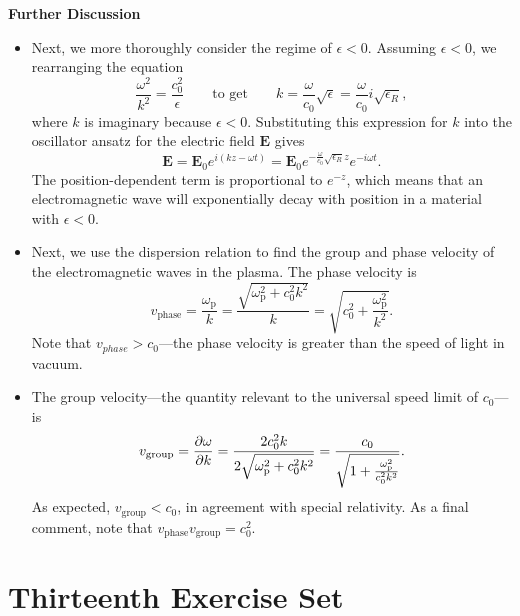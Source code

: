 \documentclass[11pt, a4paper]{article}
\newcommand{\eqtext}[1]{\qquad \text{#1} \qquad}
\renewcommand{\vec}[1]{\bm{#1}} %
\newcommand{\E}{\vec{E}}  %
\newcommand{\e}{\epsilon}
\begin{document}
\textbf{Further Discussion}	
\begin{itemize}
	
	\item Next, we more thoroughly consider the regime of $ \e < 0 $. Assuming $ \e < 0 $, we rearranging the equation 
	\begin{equation*}
		\frac{\omega^{2}}{k^{2}} = \frac{c_{0}^{2}}{\e} \eqtext{to get} k = \frac{\omega}{c_{0}}\sqrt{\e}  = \frac{\omega}{c_{0}}i \sqrt{\e_{R}},
	\end{equation*}
	where $ k $ is imaginary because $ \e < 0 $. Substituting this expression for $ k $ into the oscillator ansatz for the electric field $ \E $ gives
	\begin{equation*}
		\E = \E_{0} e^{i(kz - \omega t)} = \E_{0}e^{-\frac{\omega}{c_{0}}\sqrt{\e_{R}}z}e^{-i\omega t}.
	\end{equation*}
	The position-dependent term is proportional to $ e^{-z} $, which means that an electromagnetic wave will exponentially decay with position in a material with $ \e < 0 $. 
	
	\item Next, we use the dispersion relation to find the group and phase velocity of the electromagnetic waves in the plasma. The phase velocity is 
	\begin{equation*}
		v_{\text{phase}} = \frac{\omega_{\mathrm{p}}}{k} = \frac{\sqrt{\omega_{\mathrm{p}}^{2} + c_{0}^{2}k^{2}}}{k} = \sqrt{c_{0}^{2} + \frac{\omega_{\mathrm{p}}^{2}}{k^{2}}}.
	\end{equation*}
	Note that $ v_{phase} > c_{0} $---the phase velocity is greater than the speed of light in vacuum. 
	
	\item The group velocity---the quantity relevant to the universal speed limit of $ c_{0} $---is 
	\begin{equation*}
		v_{\mathrm{group}} = \pdv{\omega}{k} = \frac{2 c_{0}^{2}k}{2 \sqrt{\omega_{\mathrm{p}}^{2} + c_{0}^{2}k^{2}}} = \frac{c_{0}}{\sqrt{1 + \frac{\omega_{\mathrm{p}}^{2}}{c_{0}^{2}k^{2}}}}.
	\end{equation*}
	As expected, $ v_{\mathrm{group}} < c_{0} $, in agreement with special relativity. As a final comment, note that $ v_{\mathrm{phase}}v_{\mathrm{group}} = c_{0}^{2} $.
\end{itemize}

\section{Thirteenth Exercise Set}
\end{document}
